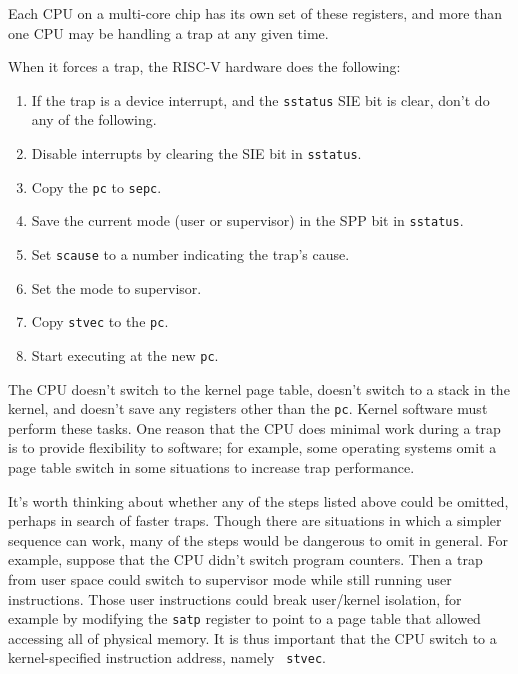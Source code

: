 Each CPU on a multi-core chip has its own set of these registers,
and more than one CPU may be handling a trap at any given time.

When it forces a trap, the RISC-V hardware does the following:

\begin{enumerate}

\item If the trap is a device interrupt, and the {\tt sstatus} SIE bit
  is clear, don't do any of the following.

\item Disable interrupts by clearing the SIE bit in {\tt sstatus}.

\item Copy the {\tt pc} to {\tt sepc}.

\item Save the current mode (user or supervisor) in the SPP bit in {\tt sstatus}.

\item Set {\tt scause} to a number indicating the trap's cause.

\item Set the mode to supervisor.

\item Copy {\tt stvec} to the {\tt pc}.

\item Start executing at the new {\tt pc}.

\end{enumerate}

The CPU doesn't switch to the kernel page table, doesn't
switch to a stack in the kernel, and doesn't save any registers other
than the {\tt pc}. Kernel software must perform these tasks.
One reason that the CPU does minimal work during a trap is to provide
flexibility to software; for example, some operating systems
omit a page table switch in some situations to increase
trap performance.

It's worth thinking about whether any of the steps listed above could
be omitted, perhaps in search of faster traps. Though there are
situations in which a simpler sequence can work, many of the steps
would be dangerous to omit in general. For example, suppose that the
CPU didn't switch program counters. Then a trap from user space could
switch to supervisor mode while still running user instructions. Those
user instructions could break user/kernel isolation, for example
by modifying the {\tt satp} register to point to a page table that
allowed accessing all of physical memory. It is thus important that
the CPU switch to a kernel-specified instruction address, namely {\tt
  stvec}.

